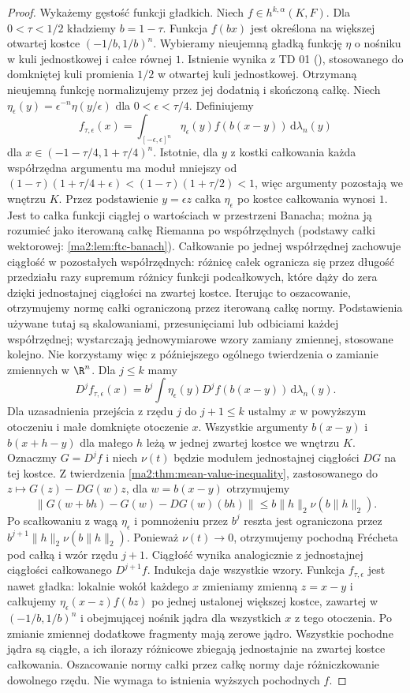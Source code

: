 \begin{proof}
Wykażemy gęstość funkcji gładkich. Niech
$f\in h^{k,\alpha}(K,F)$. Dla $0<\tau<1/2$
kładziemy $b=1-\tau$. Funkcja $f(bx)$ jest
określona na większej otwartej kostce
$(-1/b,1/b)^n$. Wybieramy nieujemną
gładką funkcję $\eta$ o nośniku w kuli
jednostkowej i całce równej $1$.
Istnienie wynika z TD 01
(), stosowanego do
domkniętej kuli promienia $1/2$ w otwartej
kuli jednostkowej. Otrzymaną nieujemną
funkcję normalizujemy przez jej dodatnią
i skończoną całkę. Niech
$\eta_\epsilon(y)=\epsilon^{-n}\eta(y/\epsilon)$
dla $0<\epsilon<\tau/4$. Definiujemy
\[
 f_{\tau,\epsilon}(x)=
 \int_{[-\epsilon,\epsilon]^n}
       \eta_\epsilon(y) f(b(x-y))\,\mathrm d\lambda_n(y)
\]
dla $x\in(-1-\tau/4,1+\tau/4)^n$.
Istotnie, dla $y$ z kostki całkowania
każda współrzędna argumentu ma moduł
mniejszy od
$(1-\tau)(1+\tau/4+\epsilon)
<(1-\tau)(1+\tau/2)<1$,
więc argumenty pozostają we wnętrzu $K$.
Przez podstawienie $y=\epsilon z$ całka
$\eta_\epsilon$ po kostce całkowania wynosi $1$.
Jest to całka funkcji ciągłej o wartościach
w przestrzeni Banacha; można ją rozumieć
jako iterowaną całkę Riemanna po współrzędnych
(podstawy całki wektorowej: \ref{ma2:lem:ftc-banach}).
Całkowanie po jednej współrzędnej zachowuje ciągłość
w pozostałych współrzędnych: różnicę całek ogranicza
się przez długość przedziału razy supremum różnicy
funkcji podcałkowych, które dąży do zera dzięki
jednostajnej ciągłości na zwartej kostce.
Iterując to oszacowanie, otrzymujemy normę całki
ograniczoną przez iterowaną całkę normy.
Podstawienia używane tutaj są skalowaniami,
przesunięciami lub odbiciami każdej współrzędnej;
wystarczają jednowymiarowe wzory zamiany zmiennej,
stosowane kolejno. Nie korzystamy więc z późniejszego
ogólnego twierdzenia o zamianie zmiennych w $\R^n$.
Dla $j\le k$ mamy
\[
 D^jf_{\tau,\epsilon}(x)=
 b^j\int\eta_\epsilon(y)D^jf(b(x-y))
                          \,\mathrm d\lambda_n(y).
\]
Dla uzasadnienia przejścia z rzędu $j$ do
$j+1\le k$ ustalmy $x$ w powyższym otoczeniu
i małe domknięte otoczenie $x$.
Wszystkie argumenty $b(x-y)$ i $b(x+h-y)$
dla małego $h$ leżą w jednej zwartej
kostce we wnętrzu $K$.
Oznaczmy $G=D^jf$ i niech $\nu(t)$
będzie modułem jednostajnej ciągłości
$DG$ na tej kostce. Z twierdzenia
\ref{ma2:thm:mean-value-inequality},
zastosowanego do $z\mapsto G(z)-DG(w)z$,
dla $w=b(x-y)$ otrzymujemy
\[
 \|G(w+bh)-G(w)-DG(w)(bh)\|
 \le b\|h\|_2\nu(b\|h\|_2).
\]
Po scałkowaniu z wagą $\eta_\epsilon$
i pomnożeniu przez $b^j$ reszta jest
ograniczona przez
$b^{j+1}\|h\|_2\nu(b\|h\|_2)$.
Ponieważ $\nu(t)\to0$, otrzymujemy
pochodną Frécheta pod całką i wzór rzędu
$j+1$. Ciągłość wynika analogicznie
z jednostajnej ciągłości całkowanego
$D^{j+1}f$. Indukcja daje wszystkie wzory.
Funkcja $f_{\tau,\epsilon}$ jest nawet gładka:
lokalnie wokół każdego $x$ zmieniamy zmienną
$z=x-y$ i całkujemy $\eta_\epsilon(x-z)f(bz)$
po jednej ustalonej większej kostce, zawartej
w $(-1/b,1/b)^n$ i obejmującej nośnik jądra
dla wszystkich $x$ z tego otoczenia.
Po zmianie zmiennej dodatkowe fragmenty
mają zerowe jądro. Wszystkie pochodne
jądra są ciągłe, a ich ilorazy różnicowe
zbiegają jednostajnie na zwartej kostce
całkowania. Oszacowanie normy całki przez
całkę normy daje różniczkowanie dowolnego rzędu.
Nie wymaga to istnienia wyższych pochodnych $f$.


\end{proof}
